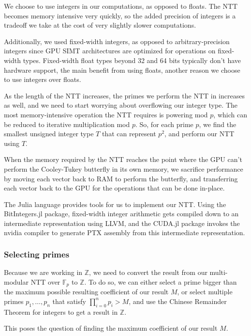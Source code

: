 We choose to use integers in our computations, as opposed to floats. The NTT becomes memory intensive very quickly, so the added precision of integers is a tradeoff we take at the cost of very slightly slower computations.

Additionally, we used fixed-width integers, as opposed to arbitrary-precision integers since GPU SIMT architectures are optimized for operations on fixed-width types. Fixed-width float types beyond 32 and 64 bits typically don't have hardware support, the main benefit from using floats, another reason we choose to use integers over floats.

As the length of the NTT increases, the primes we perform the NTT in increases as well, and we need to start worrying about overflowing our integer type. The most memory-intensive operation the NTT requires is powering mod $p$, which can be reduced to iterative multiplication mod $p$. So, for each prime $p$, we find the smallest unsigned integer type $T$ that can represent $p^2$, and perform our NTT using $T$.

When the memory required by the NTT reaches the point where the GPU can't perform the Cooley-Tukey butterfly in its own memory, we sacrifice performance by moving each vector back to RAM to perform the butterfly, and transferring each vector back to the GPU for the operations that can be done in-place.

The Julia language provides tools for us to implement our NTT. Using the BitIntegers.jl package, fixed-width integer arithmetic gets compiled down to an intermediate representation using LLVM, and the CUDA.jl package invokes the nvidia compiler to generate PTX assembly from this intermediate representation.

\subsubsection{Selecting primes}

Because we are working in $\mathbb{Z}$, we need to convert the result from our multi-modular NTT over $\mathbb{F}_p$ to $\mathbb{Z}$. To do so, we can either select a prime bigger than the maximum possible resulting coefficient of our result $M$, or select multiple primes $p_1,\dots , p_n$ that satisfy $\prod_{i=0}^{n} p_i > M$, and use the Chinese Remainder Theorem for integers to get a result in $\mathbb{Z}$.

This poses the question of finding the maximum coefficient of our result $M$. 

